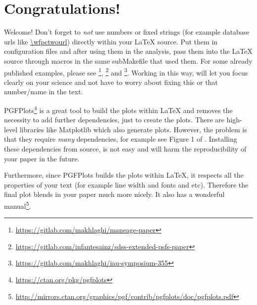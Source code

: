 \documentclass[10pt, twocolumn]{article}
\title{\large \uppercase{\projecttitle}}
\author[1]{Carlos Allende Prieto}
\affil[1]{Instituto de Astrof\'{\i}sica de Canarias; \url{callende@iac.es}
\par \emph{Received YYYY MM DD; accepted YYYY MM DD; published YYYY MM DD}}
\date{}
\begin{document}

\thispagestyle{firststyle}





\section{Congratulations!}

Welcome! Don't forget to \emph{not} use numbers or fixed strings (for example database urls like \url{\wfpctwourl}) directly within your \LaTeX{} source.
Put them in configuration files and after using them in the analysis, pass them into the \LaTeX{} source through macros in the same subMakefile that used them.
For some already published examples, please see \citet{maneage}\footnote{\url{https://gitlab.com/makhlaghi/maneage-paper}}, \citet{infantesainz20}\footnote{\url{https://gitlab.com/infantesainz/sdss-extended-psfs-paper}} and \citet{akhlaghi19}\footnote{\url{https://gitlab.com/makhlaghi/iau-symposium-355}}.
Working in this way, will let you focus clearly on your science and not have to worry about fixing this or that number/name in the text.



{\small PGFP}lots\footnote{\url{https://ctan.org/pkg/pgfplots}} is a great tool to build the plots within \LaTeX{} and removes the necessity to add further dependencies, just to create the plots.
There are high-level libraries like Matplotlib which also generate plots.
However, the problem is that they require \emph{many} dependencies, for example see Figure 1 of \citet{alliez19}.
Installing these dependencies from source, is not easy and will harm the reproducibility of your paper in the future.

Furthermore, since {\small PGFP}lots builds the plots within \LaTeX{}, it respects all the properties of your text (for example line width and fonts and etc).
Therefore the final plot blends in your paper much more nicely.
It also has a wonderful manual\footnote{\url{http://mirrors.ctan.org/graphics/pgf/contrib/pgfplots/doc/pgfplots.pdf}}.
\end{document}
